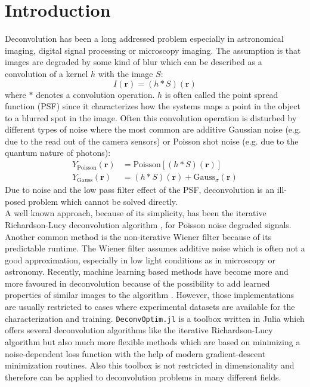\documentclass{juliacon}
\begin{document}
\section{Introduction}
Deconvolution has been a long addressed problem especially in astronomical imaging, digital signal processing or microscopy imaging.
The assumption is that images are degraded by some kind of blur which can be described as a convolution of a kernel $h$ with the image $S$:
\begin{equation}
    I(\mathbf r) = (h * S)(\mathbf r)
\end{equation}
where $*$ denotes a convolution operation.
$h$ is often called the point spread function (PSF) since it characterizes how the systems maps a point in the object to a blurred spot 
in the image.
Often this convolution operation is disturbed by different types of noise where the most common are additive Gaussian noise (e.g. due to the read out of the camera sensors) or Poisson shot noise (e.g. due to the quantum nature of photons):
\begin{align}
    Y_{\text{Poisson}}(\mathbf r) &= \text{Poisson}[(h * S)(\mathbf r)]\\
    Y_{\text{Gauss}}(\mathbf r) &= (h * S)(\mathbf r) + \text{Gauss}_{\sigma}(\mathbf r)
\end{align}
Due to noise and the low pass filter effect of the PSF, deconvolution is an ill-posed problem which cannot be solved directly.\\
A well known approach, because of its simplicity, has been the iterative Richardson-Lucy deconvolution algorithm 
\cite{Richardson:72}, \cite{lucy:74} for Poisson noise degraded signals.
Another common method is the non-iterative Wiener filter \cite{wiener2013extrapolation} because of its predictable runtime.
The Wiener filter assumes additive noise which is often not a good approximation, especially in low light conditions as in microscopy or astronomy. 
Recently, machine learning based methods have become more and more favoured in deconvolution because
of the possibility to add learned properties of similar images to the algorithm \cite{Kruse_2017_ICCV}.
However, those implementations are usually restricted to cases where experimental datasets are available for the characterization and training.
\verb|DeconvOptim.jl| is a toolbox written in Julia \cite{bezanson2017julia} which offers several deconvolution algorithms 
like the iterative Richardson-Lucy algorithm but also
much more flexible methods which are based on minimizing a 
noise-dependent loss function with the help of modern gradient-descent minimization routines. 
Also this toolbox is not restricted in dimensionality and therefore can be applied to deconvolution problems in many different fields.
\end{document}
